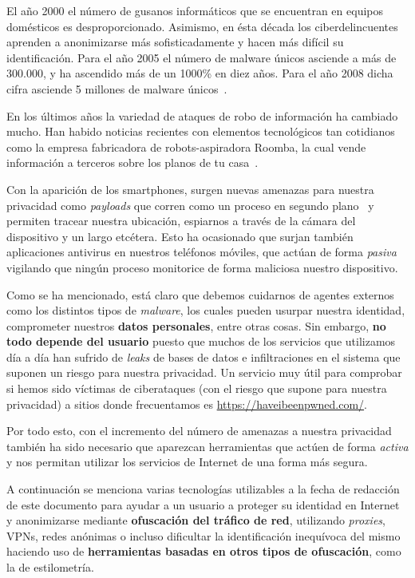 El año 2000 el número de gusanos informáticos que se encuentran en equipos domésticos es desproporcionado. Asimismo, en ésta década los ciberdelincuentes aprenden a anonimizarse más sofisticadamente y hacen más difícil su identificación.
Para el año 2005 el número de malware únicos asciende a más de 300.000, y ha ascendido más de un 1000\% en diez años. Para el año 2008 dicha cifra asciende 5 millones de malware únicos~\cite{article:number_malware}.

En los últimos años la variedad de ataques de robo de información ha cambiado mucho. Han habido noticias recientes con elementos tecnológicos tan cotidianos como la empresa fabricadora de robots-aspiradora Roomba, la cual vende información a terceros sobre los planos de tu casa~\cite{article:roomba}. 

Con la aparición de los smartphones, surgen nuevas amenazas para nuestra privacidad como \textit{payloads} que corren como un proceso en segundo plano~\cite{article:android} y permiten tracear nuestra ubicación, espiarnos a través de la cámara del dispositivo y un largo etcétera. Esto ha ocasionado que surjan también aplicaciones antivirus en nuestros teléfonos móviles, que actúan de forma \textit{pasiva} vigilando que ningún proceso monitorice de forma maliciosa nuestro dispositivo. 

Como se ha mencionado, está claro que debemos cuidarnos de agentes externos como los distintos tipos de \textit{malware}, los cuales pueden usurpar nuestra identidad, comprometer nuestros \textbf{datos personales}, entre otras cosas. 
Sin embargo, \textbf{no todo depende del usuario }puesto que muchos de los servicios que utilizamos día a día han sufrido de \textit{leaks} de bases de datos e infiltraciones en el sistema que suponen un riesgo para nuestra privacidad. Un servicio muy útil para comprobar si hemos sido víctimas de ciberataques (con el riesgo que supone para nuestra privacidad) a sitios donde frecuentamos es \url{https://haveibeenpwned.com/}.

Por todo esto, con el incremento del número de amenazas a nuestra privacidad también ha sido necesario que aparezcan herramientas que actúen de forma \textit{activa} y nos permitan utilizar los servicios de Internet de una forma más segura.

	
\label{sec:a_favor}

A continuación se menciona varias tecnologías utilizables a la fecha de redacción de este documento para ayudar a un usuario a proteger su identidad en Internet y anonimizarse mediante \textbf{ofuscación del tráfico de red}, utilizando \textit{proxies}, VPNs, redes anónimas o incluso dificultar la identificación inequívoca del mismo haciendo uso de \textbf{herramientas basadas en otros tipos de ofuscación}, como la de estilometría.

